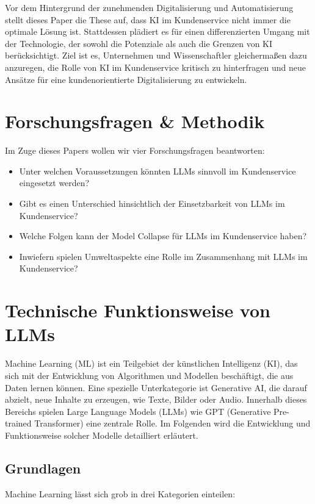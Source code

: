 \documentclass[12pt]{article}
\begin{document}
Vor dem Hintergrund der zunehmenden Digitalisierung und Automatisierung stellt dieses Paper die These auf, dass KI im Kundenservice nicht immer die optimale Lösung ist.
Stattdessen plädiert es für einen differenzierten Umgang mit der Technologie, der sowohl die Potenziale als auch die Grenzen von KI berücksichtigt.
Ziel ist es, Unternehmen und Wissenschaftler gleichermaßen dazu anzuregen, die Rolle von KI im Kundenservice kritisch zu hinterfragen und neue Ansätze für eine kundenorientierte Digitalisierung zu entwickeln.

\section{Forschungsfragen \& Methodik}

Im Zuge dieses Papers wollen wir vier Forschungsfragen beantworten:
\begin{itemize}
    \item Unter welchen Voraussetzungen könnten LLMs sinnvoll im Kundenservice eingesetzt werden?
    \item Gibt es einen Unterschied hinsichtlich der Einsetzbarkeit von LLMs im Kundenservice?
    \item Welche Folgen kann der Model Collapse für LLMs im Kundenservice haben?
    \item Inwiefern spielen Umweltaspekte eine Rolle im Zusammenhang mit LLMs im Kundenservice?
\end{itemize}

\section{Technische Funktionsweise von LLMs}

Machine Learning (ML) ist ein Teilgebiet der künstlichen Intelligenz (KI), das sich mit der Entwicklung von Algorithmen und Modellen beschäftigt, die aus Daten lernen können. Eine spezielle Unterkategorie ist Generative AI, die darauf abzielt, neue Inhalte zu erzeugen, wie Texte, Bilder oder Audio. Innerhalb dieses Bereichs spielen Large Language Models (LLMs) wie GPT (Generative Pre-trained Transformer) eine zentrale Rolle. Im Folgenden wird die Entwicklung und Funktionsweise solcher Modelle detailliert erläutert.

\subsection{Grundlagen}

Machine Learning lässt sich grob in drei Kategorien einteilen:
\end{document}
